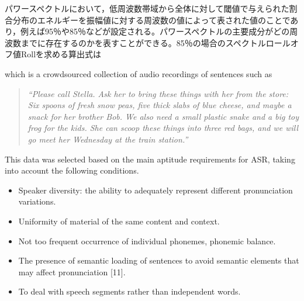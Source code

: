 パワースペクトルにおいて，低周波数帯域から全体に対して閾値で与えられた割合分布のエネルギーを振幅値に対する周波数の値によって表された値のことであり，例えば95％や85％などが設定される。パワースペクトルの主要成分がどの周波数までに存在するのかを表すことができる。85％の場合のスペクトルロールオフ値Rollを求める算出式は\documentclass[ams]{U-AizuGT}
\begin{document}
which is a crowdsourced collection of audio recordings of sentences such as
\begin{quotation}{\it “Please call Stella. Ask her to bring these things with her from the store: Six spoons of fresh snow peas, five thick slabs of blue cheese, and maybe a snack for her brother Bob. We also need a small plastic snake and a big toy frog for the kids. She can scoop these things into three red bags, and we will go meet her Wednesday at the train station.”}
\end{quotation}
This data was selected based on the main aptitude requirements for ASR, taking into account the following conditions.
\begin{itemize}
\item {Speaker diversity: the ability to adequately represent different pronunciation variations.}
\item {Uniformity of material of the same content and context.}
\item {Not too frequent occurrence of individual phonemes, phonemic balance.}
\item {The presence of semantic loading of sentences to avoid semantic elements that may affect pronunciation [11].}
\item {To deal with speech segments rather than independent words.}
\end{itemize}
\end{document}
